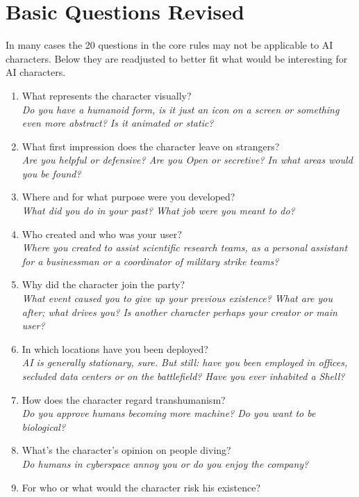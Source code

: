 \documentclass[12pt,a4paper,openany]{book}
\begin{document}
	\section{Basic Questions Revised}
	In many cases the 20 questions in the core rules may not be applicable to AI characters. Below they are readjusted to better fit what would be interesting for AI characters.
	\vspace{-8mm}
	\begin{enumerate}
		\setlength\itemsep{-6mm}
		\item What represents the character visually?\\
		\textit{Do you have a humanoid form, is it just an icon on a screen or something even more abstract? Is it animated or static?}
		\item What first impression does the character leave on strangers?\\
		\textit{Are you helpful or defensive? Are you Open or secretive? In what areas would you be found?}
		\item Where and for what purpose were you developed?\\
		\textit{What did you do in your past? What job were you meant to do?}
		\item Who created and who was your user?\\
		\textit{Where you created to assist scientific research teams, as a personal assistant for a businessman or a coordinator of military strike teams?}
		\item Why did the character join the party?\\
		\textit{What event caused you to give up your previous existence? What are you after; what drives you? Is another character perhaps your creator or main user?}
		\item In which locations have you been deployed?\\
		\textit{AI is generally stationary, sure. But still: have you been employed in offices, secluded data centers or on the battlefield? Have you ever inhabited a Shell?}
		\item How does the character regard transhumanism?\\
		\textit{Do you approve humans becoming more machine? Do you want to be biological?}
		\item What’s the character’s opinion on people diving?\\
		\textit{Do humans in cyberspace annoy you or do you enjoy the company?}
		\item For who or what would the character risk his existence?\\

\end{enumerate}
\end{document}
